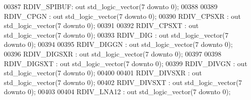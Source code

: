 \begin{DoxyCode}
00387         RDIV\_SPIBUF: \textcolor{keywordflow}{out} \textcolor{comment}{std\_logic\_vector}(\textcolor{vhdllogic}{}\textcolor{vhdllogic}{7} \textcolor{keywordflow}{downto} \textcolor{vhdllogic}{}\textcolor{vhdllogic}{0});
00388 
00389         RDIV\_CPGN           : \textcolor{keywordflow}{out} \textcolor{comment}{std\_logic\_vector}(\textcolor{vhdllogic}{}\textcolor{vhdllogic}{7} \textcolor{keywordflow}{downto} \textcolor{vhdllogic}{}\textcolor{vhdllogic}{0});
00390         RDIV\_CPSXR      : \textcolor{keywordflow}{out} \textcolor{comment}{std\_logic\_vector}(\textcolor{vhdllogic}{}\textcolor{vhdllogic}{7} \textcolor{keywordflow}{downto} \textcolor{vhdllogic}{}\textcolor{vhdllogic}{0});
00391 
00392         RDIV\_CPSXT      : \textcolor{keywordflow}{out} \textcolor{comment}{std\_logic\_vector}(\textcolor{vhdllogic}{}\textcolor{vhdllogic}{7} \textcolor{keywordflow}{downto} \textcolor{vhdllogic}{}\textcolor{vhdllogic}{0});
00393         RDIV\_DIG        : \textcolor{keywordflow}{out} \textcolor{comment}{std\_logic\_vector}(\textcolor{vhdllogic}{}\textcolor{vhdllogic}{7} \textcolor{keywordflow}{downto} \textcolor{vhdllogic}{}\textcolor{vhdllogic}{0});
00394 
00395         RDIV\_DIGGN      : \textcolor{keywordflow}{out} \textcolor{comment}{std\_logic\_vector}(\textcolor{vhdllogic}{}\textcolor{vhdllogic}{7} \textcolor{keywordflow}{downto} \textcolor{vhdllogic}{}\textcolor{vhdllogic}{0});
00396         RDIV\_DIGSXR     : \textcolor{keywordflow}{out} \textcolor{comment}{std\_logic\_vector}(\textcolor{vhdllogic}{}\textcolor{vhdllogic}{7} \textcolor{keywordflow}{downto} \textcolor{vhdllogic}{}\textcolor{vhdllogic}{0});
00397 
00398         RDIV\_DIGSXT     : \textcolor{keywordflow}{out} \textcolor{comment}{std\_logic\_vector}(\textcolor{vhdllogic}{}\textcolor{vhdllogic}{7} \textcolor{keywordflow}{downto} \textcolor{vhdllogic}{}\textcolor{vhdllogic}{0});
00399         RDIV\_DIVGN      : \textcolor{keywordflow}{out} \textcolor{comment}{std\_logic\_vector}(\textcolor{vhdllogic}{}\textcolor{vhdllogic}{7} \textcolor{keywordflow}{downto} \textcolor{vhdllogic}{}\textcolor{vhdllogic}{0});
00400 
00401         RDIV\_DIVSXR     : \textcolor{keywordflow}{out} \textcolor{comment}{std\_logic\_vector}(\textcolor{vhdllogic}{}\textcolor{vhdllogic}{7} \textcolor{keywordflow}{downto} \textcolor{vhdllogic}{}\textcolor{vhdllogic}{0});
00402         RDIV\_DIVSXT     : \textcolor{keywordflow}{out} \textcolor{comment}{std\_logic\_vector}(\textcolor{vhdllogic}{}\textcolor{vhdllogic}{7} \textcolor{keywordflow}{downto} \textcolor{vhdllogic}{}\textcolor{vhdllogic}{0});
00403 
00404         RDIV\_LNA12      : \textcolor{keywordflow}{out} \textcolor{comment}{std\_logic\_vector}(\textcolor{vhdllogic}{}\textcolor{vhdllogic}{7} \textcolor{keywordflow}{downto} \textcolor{vhdllogic}{}\textcolor{vhdllogic}{0});

\end{DoxyCode}
